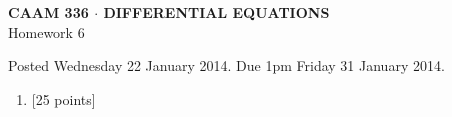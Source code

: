 \documentclass[10pt]{article}
\begin{document}
\vspace*{-5em}
\begin{center}
\large \textsf{\textbf{CAAM 336 $\cdot$ DIFFERENTIAL EQUATIONS}\\[0.5em]
Homework 6 }
\end{center}

Posted Wednesday 22 January 2014.  Due 1pm Friday 31 January 2014.

\begin{enumerate}\addtocounter{enumi}{5}
\item {[25 points]}\\  

\end{enumerate}
\end{document}
